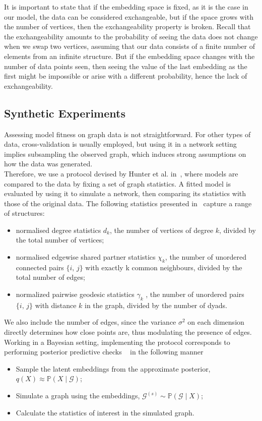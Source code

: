 \documentclass[12pt]{report}
\newcommand{\mc}[1]{\mathcal{#1}}
\newcommand{\mb}[1]{\mathbb{#1}}
\begin{document}
It is important to state that if the embedding space is fixed, as it is the case in our model, the data can be considered exchangeable, but if the space grows with the number of vertices, then the exchangeability property is broken. Recall that the exchangeability amounts to the probability of seeing the data does not change when we swap two vertices, assuming that our data consists of a finite number of elements from an infinite structure. But if the embedding space changes with the number of data points seen, then seeing the value of the last embedding as the first might be impossible or arise with a different probability, hence the lack of exchangeability. \\

\subsection{Synthetic Experiments}
Assessing model fitness on graph data is not straightforward. For other types of data, cross-validation is usually employed, but using it in a network setting implies subsampling the observed graph, which induces strong assumptions on how the data was generated. \\

Therefore, we use a protocol devised by Hunter et al. in~\parencite{hunter}, where models are compared to the data by fixing a set of graph statistics. A fitted model is evaluated by using it to simulate a network, then comparing its statistics with those of the original data. The following statistics presented in~\parencite{hunter} capture a range of structures:
\begin{itemize}
    \item normalised degree statistics $d_k$, the number of vertices of degree $k$, divided by the total number of vertices;
    \item normalised edgewise shared partner statistics $\chi_k$, the number of unordered connected pairs $\{i,\,j\}$ with exactly k common neighbours, divided by the total number of edges;
    \item normalized pairwise geodesic statistics $\gamma_k$ , the number of unordered pairs $\{i,\, j\}$ with distance $k$ in the graph, divided by the number of dyads.
\end{itemize}

We also include the number of edges, since the variance $\sigma^2$ on each dimension directly determines how close points are, thus modulating the presence of edges. Working in a Bayesian setting, implementing the protocol corresponds to performing posterior predictive checks ~\parencite{box, gelman} in the following manner
\begin{itemize}
    \item Sample the latent embeddings from the approximate posterior, $q(X) \approx \mb{P}(X \mid \mc{G})$;
    \item Simulate a graph using the embeddings, $\mc{G}^{(s)} \sim \mb{P}(\mc{G} \mid X)$;
    \item Calculate the statistics of interest in the simulated graph.
\end{itemize}
\end{document}
